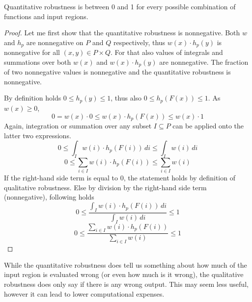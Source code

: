 \begin{lemma}{Quantitative robustness is between 0 and 1 for every possible combination
    of functions and input regions.}
    \begin{proof}
        Let me first show that the quantitative robustness is nonnegative.
        Both $w$ and $h_p$ are nonnegative on $P$ and $Q$ respectively,
        thus $w(x)\cdot h_p(y)$ is nonnegative for all $(x, y)\in P\times Q$.
        For that also values of integrals and summations over both $w(x)$
        and $w(x)\cdot h_p(y)$ are nonnegative.
        The fraction of two nonnegative values is nonnegative
        and the quantitative robustness is nonnegative.

        By definition holds $0 \leq h_p(y) \leq 1$, thus also $0 \leq h_p(F(x)) \leq 1$.
        As $w(x) \geq 0$, 
        \begin{equation*}
            0 = w(x) \cdot 0 \leq w(x) \cdot h_p(F(x)) \leq w(x)\cdot 1
        \end{equation*}
        Again, integration or summation over any subset $I \subseteq P$
        can be applied onto the latter two expressions.
        \begin{equation*}
            0 \leq \int_{I} w(i) \cdot h_p(F(i))\, di \leq \int_{I} w(i)\, di
        \end{equation*}
        \begin{equation*}
            0 \leq \sum_{i\in I} w(i) \cdot h_p(F(i)) \leq \sum_{i\in I} w(i)
        \end{equation*}
        If the right-hand side term is equal to 0,
        the statement holds by definition of qualitative robustness.
        Else by division by the right-hand side term (nonnegative), following holds
        \begin{equation*}
            0 \leq \frac{\int_{I} w(i) \cdot h_p(F(i))\, di}{\int_{I} w(i)\, di} \leq 1
        \end{equation*}
        \begin{equation*}
            0 \leq \frac{\sum_{i\in I} w(i) \cdot h_p(F(i))}{\sum_{i\in I} w(i)} \leq 1
        \end{equation*}
    \end{proof}
\end{lemma}

While the quantitative robustness does tell us something about how much
of the input region is evaluated wrong (or even how much is it wrong),
the qualitative robustness does only say if there is any wrong output.
This may seem less useful, however it can lead to lower computational expenses.

